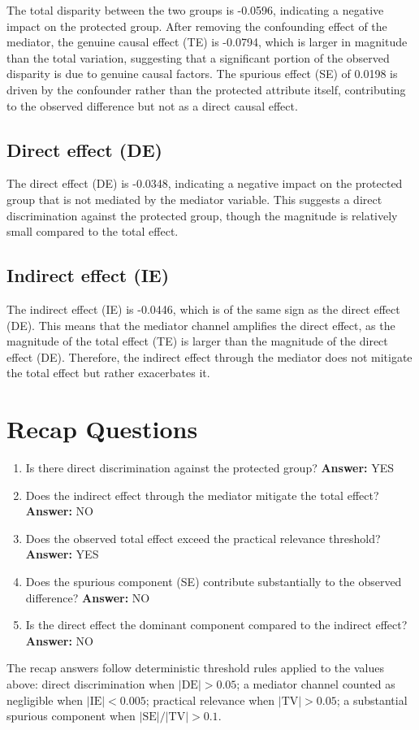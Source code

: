\documentclass[11pt]{article}
\begin{document}
The total disparity between the two groups is -0.0596, indicating a negative impact on the protected group. After removing the confounding effect of the mediator, the genuine causal effect (TE) is -0.0794, which is larger in magnitude than the total variation, suggesting that a significant portion of the observed disparity is due to genuine causal factors. The spurious effect (SE) of 0.0198 is driven by the confounder rather than the protected attribute itself, contributing to the observed difference but not as a direct causal effect.

\subsection{Direct effect (DE)}

The direct effect (DE) is -0.0348, indicating a negative impact on the protected group that is not mediated by the mediator variable. This suggests a direct discrimination against the protected group, though the magnitude is relatively small compared to the total effect.

\subsection{Indirect effect (IE)}

The indirect effect (IE) is -0.0446, which is of the same sign as the direct effect (DE). This means that the mediator channel amplifies the direct effect, as the magnitude of the total effect (TE) is larger than the magnitude of the direct effect (DE). Therefore, the indirect effect through the mediator does not mitigate the total effect but rather exacerbates it.

\section{Recap Questions}

\begin{enumerate}
\item Is there direct discrimination against the protected group? \textbf{Answer:} YES
\item Does the indirect effect through the mediator mitigate the total effect? \textbf{Answer:} NO
\item Does the observed total effect exceed the practical relevance threshold? \textbf{Answer:} YES
\item Does the spurious component (SE) contribute substantially to the observed difference? \textbf{Answer:} NO
\item Is the direct effect the dominant component compared to the indirect effect? \textbf{Answer:} NO
\end{enumerate}

\vspace{1em}
\noindent\footnotesize
The recap answers follow deterministic threshold rules applied to the values above: direct discrimination when $|\mathrm{DE}| > 0.05$; a mediator channel counted as negligible when $|\mathrm{IE}| < 0.005$; practical relevance when $|\mathrm{TV}| > 0.05$; a substantial spurious component when $|\mathrm{SE}| / |\mathrm{TV}| > 0.1$.
\end{document}
